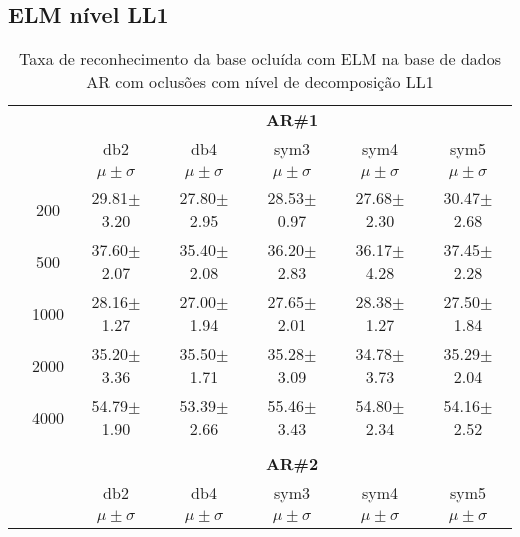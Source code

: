 \subsection{ELM nível LL1}
\begin{table}[H]
	\centering
    \normalsize
	\caption{Taxa de reconhecimento da base ocluída com ELM na base de dados AR com oclusões com nível de decomposição LL1}
	\begin{tabular}{|c|c|c c c c c|}
\cline{3-7}
\multicolumn{2}{c|}{\multirow{3}{*}{}} & \multicolumn{5}{c|}{\textbf{AR\#1}}   \\\cline{3-7} 
\multicolumn{2}{c|}{}  & db2 & db4 & sym3 & sym4 & sym5 \\\cline{3-7}%
\multicolumn{2}{c|}{}& $\mu \pm \sigma$ & $\mu \pm \sigma$ & $\mu \pm \sigma$ & $\mu \pm \sigma$ & $\mu \pm \sigma$ \\\hline


\multicolumn{1}{|c|}{ \multirow{5}{*}{\rotatebox[origin=c]{90}{\textbf{Neurônios}}} }
&200	&29.81$\pm$3.20	&27.80$\pm$2.95	&28.53$\pm$0.97	&27.68$\pm$2.30	&30.47$\pm$2.68	\\\cline{2-7}
&500	&37.60$\pm$2.07	&35.40$\pm$2.08	&36.20$\pm$2.83	&36.17$\pm$4.28	&37.45$\pm$2.28	\\\cline{2-7}
&1000	&28.16$\pm$1.27	&27.00$\pm$1.94	&27.65$\pm$2.01	&28.38$\pm$1.27	&27.50$\pm$1.84	\\\cline{2-7}
&2000	&35.20$\pm$3.36	&35.50$\pm$1.71	&35.28$\pm$3.09	&34.78$\pm$3.73	&35.29$\pm$2.04	\\\cline{2-7}
&4000	&54.79$\pm$1.90	&53.39$\pm$2.66	&55.46$\pm$3.43	&54.80$\pm$2.34	&54.16$\pm$2.52	


\\\midrule

\multicolumn{7}{c}{}\\ 

\cline{3-7}
\multicolumn{2}{c|}{\multirow{3}{*}{}} & \multicolumn{5}{c|}{\textbf{AR\#2}}   \\\cline{3-7} 

\multicolumn{2}{c|}{}  & db2 & db4 & sym3 & sym4 & sym5 \\\cline{3-7}
\multicolumn{2}{c|}{}& $\mu \pm \sigma$ & $\mu \pm \sigma$ & $\mu \pm \sigma$ & $\mu \pm \sigma$ & $\mu \pm \sigma$ \\\hline



\end{tabular}
\end{table}
